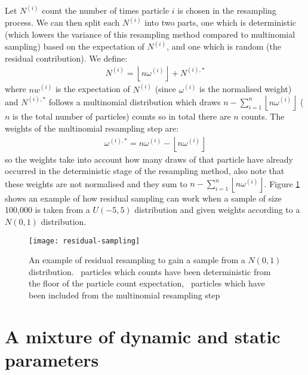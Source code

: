 Let \(N^{(i)}\) count the number of times particle \(i\) is chosen in the resampling process. We can then split each
\(N^{(i)}\) into two parts, one which is deterministic (which lowers the variance of this resampling method compared to
multinomial sampling) based on the expectation of \(N^{(i)}\), and one which is random (the residual contribution). We
define:
\begin{align}
N^{(i)} = \left \lfloor{n \omega^{(i)}}\right \rfloor + N^{(i), *}
\end{align}
where \(n w^{(i)}\) is the expectation of \(N^{(i)}\) (since \(\omega^{(i)}\) is the normalised weight) and \(N^{(i), *}\)
follows a multinomial distribution which draws \(n - \sum_{i=1}^{n} \left \lfloor{n \omega^{(i)}}\right \rfloor\) (\(n\) is
the total number of particles) counts so in total there are \(n\) counts. The weights of the multinomial resampling step
are:
\begin{align}
\omega^{(i), *} = n \omega^{(i)} - \left \lfloor{n \omega^{(i)}}\right \rfloor
\end{align}
so the weights take into account how many draws of that particle have already occurred in the deterministic stage of the
resampling method, also note that these weights are not normalised and they sum to \(n - \sum_{i=1}^{n} \left
\lfloor{n \omega^{(i)}}\right \rfloor\). Figure \ref{fig:residualResample} shows an example of how residual sampling can work
when a sample of size 100,000 is taken from a \(U(-5, 5)\) distribution and given weights according to a \(N(0,
1)\) distribution.
\begin{figure}[htp]
\begin{center}
\texttt{[image: residual-sampling]}
\caption{An example of residual resampling to gain a sample from a \(N(0, 1)\) distribution. \protect\blueBox\ particles
which counts have been deterministic from the floor of the particle count expectation, \protect\redBox\ particles which
have been included from the multinomial resampling step}
\label{fig:residualResample}
\end{center}
\end{figure}

\section{A mixture of dynamic and static parameters}
\label{sec:A_mixture_of_dynamic_and_static_parameters}

